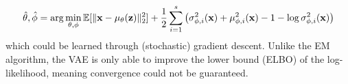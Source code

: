 \[
    \hat{\theta},\hat{\phi} = \arg\min_{\theta,\phi} \mathbb{E}[\|\mathbf{x} - \mu_\theta(\mathbf{z})\|_2^2] + \frac{1}{2} \sum_{i=1}^s \left( \sigma_{\phi,i}^2(\mathbf{x}) + \mu_{\phi,i}^2(\mathbf{x}) - 1 - \log \sigma_{\phi,i}^2(\mathbf{x}) \right)
\]
which could be learned through (stochastic) gradient descent. Unlike the EM algorithm, the VAE is only able to improve the lower bound (ELBO) of the log-likelihood, meaning convergence could not be guaranteed.